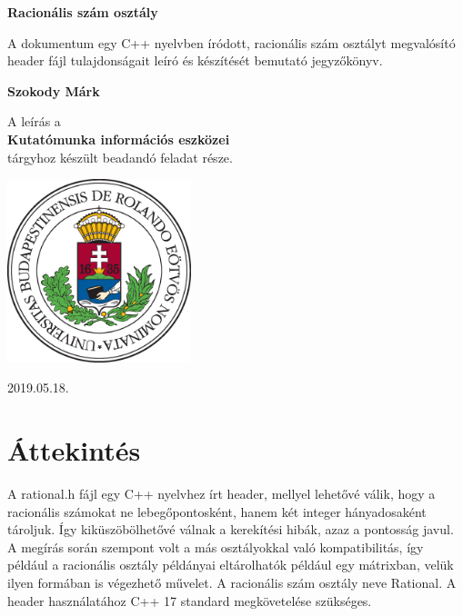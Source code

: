 \documentclass[a4paper, 12pt]{article}
\begin{document}
\begin{titlepage}
    \begin{center}
        \vspace*{1cm}
 
        \Huge
        \textbf{Racionális szám osztály\\}
 
        \vspace{0.5cm}
        \Large
	A dokumentum egy C++ nyelvben íródott, racionális szám osztályt megvalósító header fájl tulajdonságait leíró és készítését			bemutató jegyzőkönyv.
 
        \vspace{1.5cm}
 
        \textbf{ Szokody Márk\\}
 
        \vfill

        \large  

        A leírás a\\
       \textbf{ Kutatómunka információs eszközei}\\
        tárgyhoz készült beadandó feladat része.
 
        \vspace{0.8cm}
 
        \includegraphics[width=0.4\textwidth]{elte.eps}
 
        \Large
        2019.05.18.
 
    \end{center}
\end{titlepage}

\section{Áttekintés}
A rational.h fájl egy C++ nyelvhez írt header, mellyel lehetővé válik, hogy a racionális számokat ne lebegőpontosként,
hanem két integer hányadosaként tároljuk. Így kiküszöbölhetővé válnak a kerekítési hibák, azaz a pontosság javul.
A megírás során szempont volt a más osztályokkal való kompatibilitás, így például a racionális osztály példányai eltárolhatók például
egy mátrixban, velük ilyen formában is végezhető művelet. A racionális szám osztály neve Rational. A header használatához C++ 17 standard megkövetelése szükséges.
\end{document}
